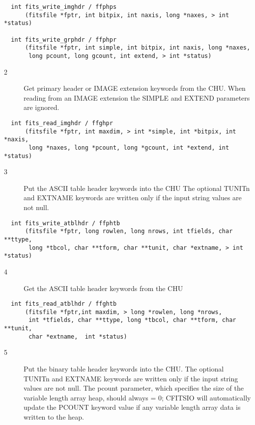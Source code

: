 \begin{verbatim}
  int fits_write_imghdr / ffphps
      (fitsfile *fptr, int bitpix, int naxis, long *naxes, > int *status)

  int fits_write_grphdr / ffphpr
      (fitsfile *fptr, int simple, int bitpix, int naxis, long *naxes,
       long pcount, long gcount, int extend, > int *status)
\end{verbatim}

\begin{description}
\item[2 ] Get primary header or IMAGE extension keywords from the CHU.  When
    reading from an IMAGE extension the SIMPLE and EXTEND parameters are
   ignored.
\end{description}

\begin{verbatim}
  int fits_read_imghdr / ffghpr
      (fitsfile *fptr, int maxdim, > int *simple, int *bitpix, int *naxis,
       long *naxes, long *pcount, long *gcount, int *extend, int *status)
\end{verbatim}

\begin{description}
\item[3 ] Put the ASCII table header keywords into the CHU The optional
    TUNITn and EXTNAME keywords are written only if the input string
   values are not null.
\end{description}

\begin{verbatim}
  int fits_write_atblhdr / ffphtb
      (fitsfile *fptr, long rowlen, long nrows, int tfields, char **ttype,
       long *tbcol, char **tform, char **tunit, char *extname, > int *status)
\end{verbatim}

\begin{description}
\item[4 ] Get the ASCII table header keywords from the CHU
\end{description}

\begin{verbatim}
  int fits_read_atblhdr / ffghtb
      (fitsfile *fptr,int maxdim, > long *rowlen, long *nrows,
       int *tfields, char **ttype, long *tbcol, char **tform, char **tunit,
       char *extname,  int *status)
\end{verbatim}

\begin{description}
\item[5 ]Put the binary table header keywords into the CHU. The optional
   TUNITn and EXTNAME keywords are written only if the input string
   values are not null.  The pcount parameter, which specifies the
   size of the variable length array heap, should always = 0;
   CFITSIO will automatically update the PCOUNT keyword value if any
  variable length array data is written to the heap.
\end{description}

